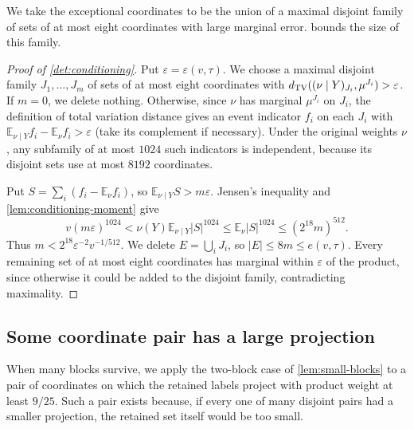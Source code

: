 \documentclass[11pt,letterpaper]{article} \usepackage[utf8]{inputenc}
\theoremstyle{plain} \newtheorem{theorem}{Theorem}[section]
\theoremstyle{definition} \newaliascnt{definition}{theorem}
\begin{document}
We take the exceptional coordinates to be the union of a maximal disjoint
family of sets of at most eight coordinates with large marginal error.  bounds the size of this family.

\begin{proof}[Proof of \cref{det:conditioning}]
\label{proof:det:conditioning}
Put $\varepsilon=\varepsilon(v,\tau)$. We choose a maximal disjoint family
$J_1,\ldots,J_m$ of sets of at most eight coordinates with
$d_{\rm TV}((\nu\mid Y)_{J_i},\mu^{J_i})>\varepsilon$.
If $m=0$, we delete nothing. Otherwise, since $\nu$ has marginal $\mu^{J_i}$ on $J_i$, the definition of total variation distance
gives an event indicator $f_i$ on each $J_i$ with
$\mathbb E_{\nu\mid Y}f_i-\mathbb E_\nu f_i>\varepsilon$ (take its complement
if necessary). Under the original weights $\nu$, any subfamily of at most $1024$
such indicators is independent, because its disjoint sets use at most
$8192$ coordinates.

Put $S=\sum_i(f_i-\mathbb E_\nu f_i)$, so $\mathbb E_{\nu\mid Y}S>m\varepsilon$.
Jensen's inequality and \cref{lem:conditioning-moment} give
\[
v(m\varepsilon)^{1024}
<\nu(Y)\mathbb E_{\nu\mid Y}|S|^{1024}
\le\mathbb E_\nu|S|^{1024}
\le(2^{18}m)^{512}.
\]
Thus $m<2^{18}\varepsilon^{-2}v^{-1/512}$.
We delete $E=\bigcup_iJ_i$, so $|E|\le8m\le e(v,\tau)$. Every remaining set of
at most eight coordinates has marginal within $\varepsilon$ of the product,
since otherwise it could be added to the disjoint family, contradicting maximality.
\end{proof}

\subsection{Some coordinate pair has a large projection}

When many blocks survive, we apply the two-block case of \cref{lem:small-blocks} to a pair of
coordinates on which the retained labels project with product weight at least
$9/25$. Such a pair exists because, if every one of many disjoint pairs had a
smaller projection, the retained set itself would be too small.
\end{document}
